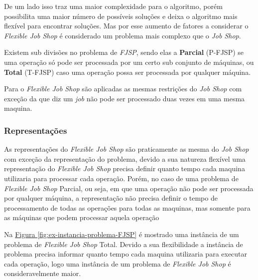             De um lado isso traz uma maior complexidade para o algoritmo, porém possibilita uma maior número de possíveis soluções e deixa o algoritmo mais flexível para encontrar soluções. Mas por esse aumento de fatores a considerar o \textit{Flexible Job Shop} é considerado um problema mais complexo que o \textit{Job Shop}.\hfill\vspace{\onelineskip}

            Existem sub divisões no problema de \textit{FJSP}, sendo elas a \textbf{Parcial} (P-FJSP) se uma operação só pode ser processada por um certo sub conjunto de máquinas, ou \textbf{Total} (T-FJSP) caso uma operação possa ser processada por qualquer máquina.\hfill\vspace{\onelineskip}

            Para o \textit{Flexible Job Shop} são aplicadas as mesmas restrições do \textit{Job Shop} com exceção da que diz um \textit{job} não pode ser processado duas vezes em uma mesma maquina.\hfill

        \subsubsection{Representações}
            As representações do \textit{Flexible Job Shop} são praticamente as mesma do \textit{Job Shop} com exceção da representação do problema, devido a sua natureza flexível uma representação do \textit{Flexible Job Shop} precisa definir quanto tempo cada maquina utilizaria para processar cada operação. Porém, no caso de uma problema de \textit{Flexible Job Shop} Parcial, ou seja, em que uma operação não pode ser processada por qualquer máquina, a representação não precisa definir o tempo de processamento de todas as operações para todas as maquinas, mas somente para as máquinas que podem processar aquela operação


            Na 
            \hyperref[fig:ex-instancia-problema-FJSP]{Figura \ref{fig:ex-instancia-problema-FJSP}} 
            é mostrado uma instância de um problema de \textit{Flexible Job Shop} Total. Devido a sua flexibilidade a instância de problema precisa informar quanto tempo cada maquina utilizaria para executar cada operação, logo uma instância de um problema de \textit{Flexible Job Shop} é consideravelmente maior.\hfill\vspace{\onelineskip}


